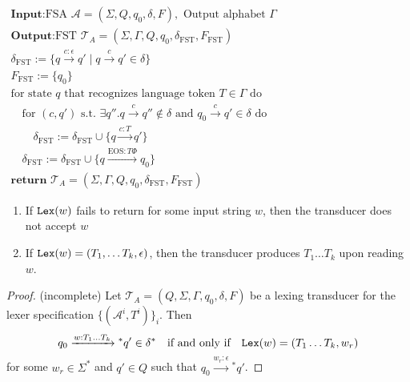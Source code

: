 \begin{definition}
    \label{def:LexingTransducer}
    $
    \begin{array}{l}
        \textbf{Input:} \text{FSA } \mathcal{A} = (\Sigma, Q, q_0, \delta, F), \text{ Output alphabet } \Gamma \\
        \textbf{Output:} \text{FST } \mathcal{T}_A = (\Sigma, \Gamma, Q, q_0, \delta_{\text{FST}}, F_{\text{FST}}) \\
        \delta_{\text{FST}} := \{ q \xrightarrow{c:\epsilon} q' \mid q \xrightarrow{c} q' \in \delta \} \\
        F_{\text{FST}} := \{q_0\} \\
        \text{for state } q \text{ that recognizes language token } T \in \Gamma \text{ do} \\
        \quad \text{for } (c, q') \text{ s.t. } \exists q''. q \xrightarrow{c} q'' \notin \delta \text{ and } q_0 \xrightarrow{c} q' \in \delta \text{ do} \\
        \quad\quad \delta_{\text{FST}} := \delta_{\text{FST}} \cup \{ q \xrightarrow{c:T} q' \} \\
        \quad \delta_{\text{FST}} := \delta_{\text{FST}} \cup \{ q \xrightarrow{\text{EOS}:T\Phi} q_0 \} \\
        \textbf{return } \mathcal{T}_A = (\Sigma, \Gamma, Q, q_0, \delta_{\text{FST}}, F_{\text{FST}})
    \end{array}
    $
\end{definition}

\begin{theorem}
    \label{thm:LexingTransducerLexEquiv}
    \begin{enumerate}
        \item If $\mathtt{Lex}(w)$ fails to return for some input string $w$, then the transducer does not accept $w$
        \item If $\mathtt{Lex}(w) = (T_1, \ldots T_k, \epsilon)$, then the transducer produces $T_1 \ldots T_k$ upon reading $w$.
    \end{enumerate}
\end{theorem}

\begin{proof}
    (incomplete)
    Let \(\mathcal{T}_A = (Q, \Sigma, \Gamma, q_0, \delta, F)\) be a lexing transducer for the lexer specification \(\{(\mathcal{A}^i, T^i)\}_i\). Then 
\[
    q_0 \xrightarrow{w : T_1 \ldots T_k}{}^* q' \in \delta^* \quad \text{if and only if} \quad \mathtt{Lex}(w) = (T_1 \ldots T_k, w_r)
    \]
    for some \(w_r \in \Sigma^*\) and \(q' \in Q\) such that \(q_0 \xrightarrow{w_r : \epsilon}{}^* q'\).
\end{proof}

